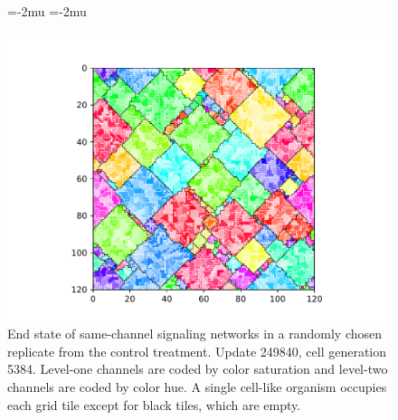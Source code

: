 \begin{figure}%
\begin{center}
\thinmuskip=-2mu
\thickmuskip=-2mu
\nulldelimiterspace=-1pt
\scriptspace=0pt

\includegraphics[width=\columnwidth,trim={2.5cm 0.5cm 2.5cm 1cm},clip]{img/ChannelMap_1018_update249840}

\caption{
End state of same-channel signaling networks in a randomly chosen replicate from the control treatment.
Update 249840, cell generation 5384.
Level-one channels are coded by color saturation and level-two channels are coded by color hue.
A single cell-like organism occupies each grid tile except for black tiles, which are empty.
}
\label{fig:outcome_control}
\end{center}
\end{figure}
